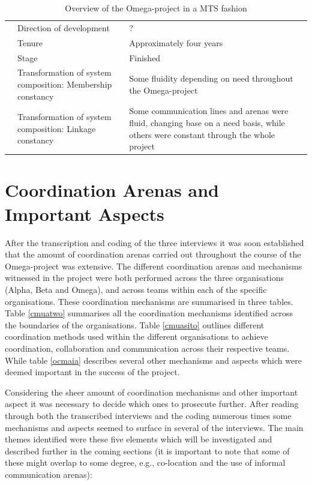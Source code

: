 \begin{table}[H]
\begin{adjustwidth}{-1.15cm}{}
\begin{tabular}{ | p{2.7cm} | p{5cm} | p{9cm} | }
 	& Direction of development & ? \\ \cline{2-3}
	& Tenure & Approximately four years \\ \cline{2-3}
	& Stage & Finished \\ \cline{2-3}
	& Transformation of system composition: Membership constancy & Some fluidity depending on need throughout the Omega-project \\ \cline{2-3}
	& Transformation of system composition: Linkage constancy & Some communication lines and arenas were fluid, changing base on a need basis, while others were constant through the whole project \\ \cline{2-3}
	\hline
\end{tabular}
\caption{Overview of the Omega-project in a MTS fashion}
\label{ootopiamf}
\end{adjustwidth}
\end{table}

\section{Coordination Arenas and Important Aspects}

After the transcription and coding of the three interviews it was soon established that the amount of coordination arenas carried out throughout the course of the Omega-project was extensive. The different coordination arenas and mechanisms witnessed in the project were both performed across the three organisations (Alpha, Beta and Omega), and across teams within each of the specific organisations. These coordination mechanisms are summarised in three tables. Table \ref{cmuatwo} summarises all the coordination mechanisms identified across the boundaries of the organisations. Table \ref{cmuasito} outlines different coordination methods used within the different organisations to achieve coordination, collaboration and communication across their respective teams. While table \ref{ocmaia} describes several other mechanisms and aspects which were deemed important in the success of the project.

Considering the sheer amount of coordination mechanisms and other important aspect it was necessary to decide which ones to prosecute further. After reading through both the transcribed interviews and the coding numerous times some mechanisms and aspects seemed to surface in several of the interviews. The main themes identified were these five elements which will be investigated and described further in the coming sections (it is important to note that some of these might overlap to some degree, e.g., co-location and the use of informal communication arenas):

